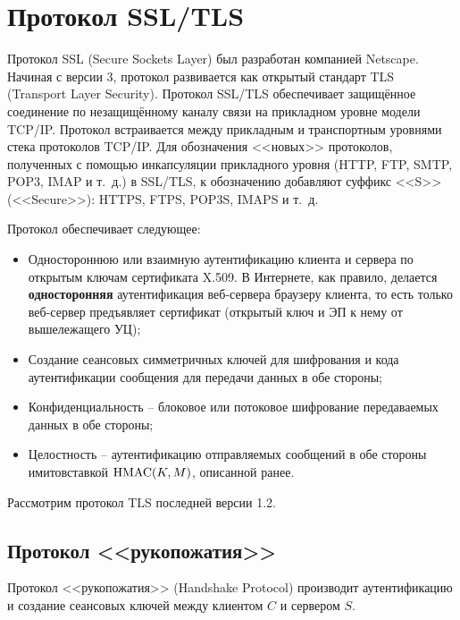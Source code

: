 \section{Протокол SSL/TLS}

Протокол SSL (Secure Sockets Layer) был разработан компанией Netscape. Начиная с версии 3, протокол развивается как открытый стандарт TLS (Transport Layer Security). Протокол SSL/TLS обеспечивает защищённое соединение по незащищённому каналу связи на прикладном уровне модели TCP/IP. Протокол встраивается между прикладным и транспортным уровнями стека протоколов TCP/IP. Для обозначения <<новых>> протоколов, полученных с помощью инкапсуляции прикладного уровня (HTTP, FTP, SMTP, POP3, IMAP и т.~д.) в SSL/TLS, к обозначению добавляют суффикс <<S>> (<<Secure>>): HTTPS, FTPS, POP3S, IMAPS и т.~д.

Протокол обеспечивает следующее:
\begin{itemize}
    \item Одностороннюю или взаимную аутентификацию клиента и сервера по открытым ключам сертификата X.509. В Интернете, как правило, делается \textbf{односторонняя} аутентификация веб-сервера браузеру клиента, то есть только веб-сервер предъявляет сертификат (открытый ключ и ЭП к нему от вышележащего УЦ);
    \item Создание сеансовых симметричных ключей для шифрования и кода аутентификации сообщения для передачи данных в обе стороны;
    \item Конфиденциальность -- блоковое или потоковое шифрование передаваемых данных в обе стороны;
    \item Целостность -- аутентификацию отправляемых сообщений в обе стороны имитовставкой $\textrm{HMAC}(K,M)$, описанной ранее.
\end{itemize}

Рассмотрим протокол TLS последней версии 1.2.


\subsection{Протокол <<рукопожатия>>}

Протокол <<рукопожатия>> (Handshake Protocol) производит аутентификацию и создание сеансовых ключей между клиентом $C$ и сервером $S$.


